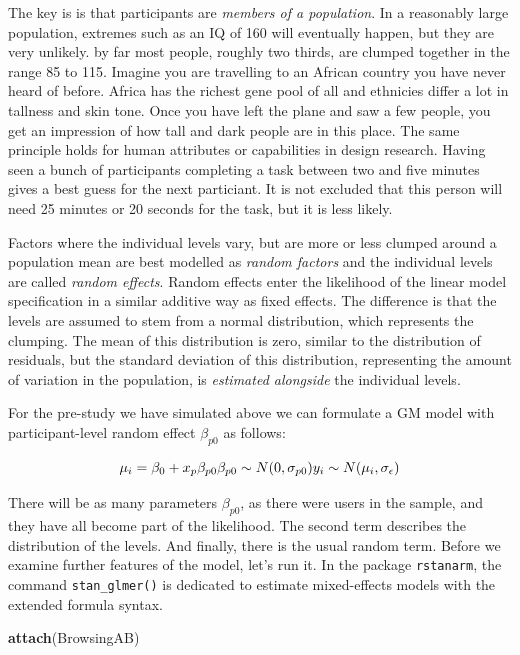 \documentclass[]{svmono}
\newenvironment{Shaded}{\begin{snugshade}}{\end{snugshade}}
\newcommand{\KeywordTok}[1]{\textcolor[rgb]{0.13,0.29,0.53}{\textbf{#1}}}
\newcommand{\NormalTok}[1]{#1}
\theoremstyle{definition}
\theoremstyle{definition}
\theoremstyle{definition}
\theoremstyle{remark}
\begin{document}
The key is is that participants are \emph{members of a population}. In a
reasonably large population, extremes such as an IQ of 160 will
eventually happen, but they are very unlikely. by far most people,
roughly two thirds, are clumped together in the range 85 to 115. Imagine
you are travelling to an African country you have never heard of before.
Africa has the richest gene pool of all and ethnicies differ a lot in
tallness and skin tone. Once you have left the plane and saw a few
people, you get an impression of how tall and dark people are in this
place. The same principle holds for human attributes or capabilities in
design research. Having seen a bunch of participants completing a task
between two and five minutes gives a best guess for the next particiant.
It is not excluded that this person will need 25 minutes or 20 seconds
for the task, but it is less likely.

Factors where the individual levels vary, but are more or less clumped
around a population mean are best modelled as \emph{random factors} and
the individual levels are called \emph{random effects}. Random effects
enter the likelihood of the linear model specification in a similar
additive way as fixed effects. The difference is that the levels are
assumed to stem from a normal distribution, which represents the
clumping. The mean of this distribution is zero, similar to the
distribution of residuals, but the standard deviation of this
distribution, representing the amount of variation in the population, is
\emph{estimated alongside} the individual levels.

For the pre-study we have simulated above we can formulate a GM model
with participant-level random effect \(\beta_{p0}\) as follows:

\[
\mu_i = \beta_0 + x_p\beta_{p0}\\
\beta_{p0} \sim N(0, \sigma_{p0})\\
y_i \sim N(\mu_i, \sigma_\epsilon)
\]

There will be as many parameters \(\beta_{p0}\), as there were users in
the sample, and they have all become part of the likelihood. The second
term describes the distribution of the levels. And finally, there is the
usual random term. Before we examine further features of the model,
let's run it. In the package \texttt{rstanarm}, the command
\texttt{stan\_glmer()} is dedicated to estimate mixed-effects models
with the extended formula syntax.

\begin{Shaded}
\begin{Highlighting}[]
\KeywordTok{attach}\NormalTok{(BrowsingAB)}
\end{Highlighting}
\end{Shaded}
\end{document}

